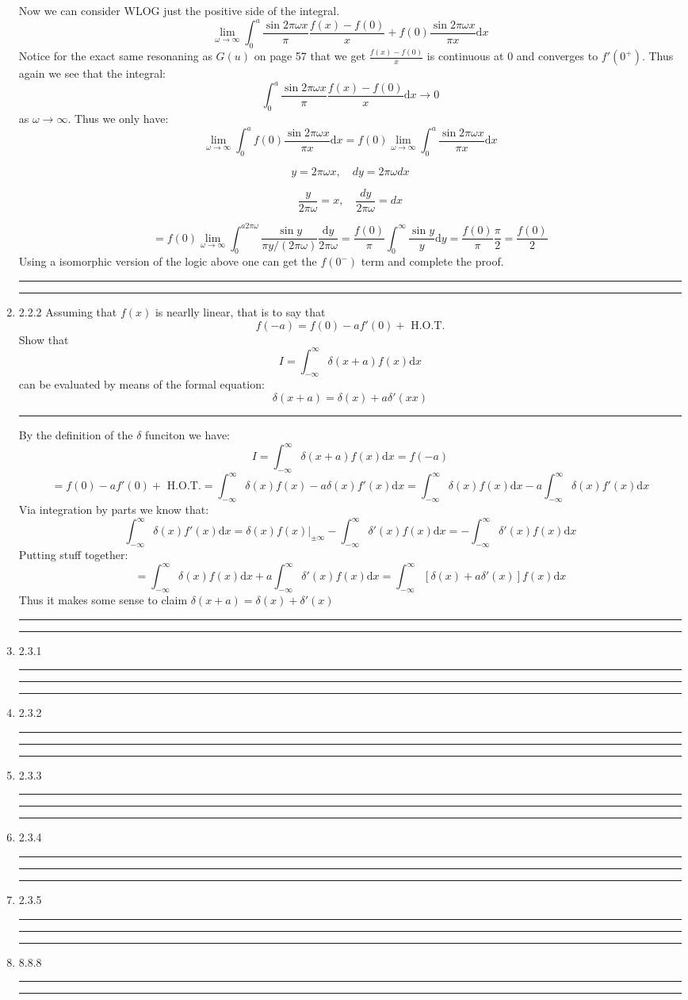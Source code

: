 \documentclass[12pt]{article}
\newcommand{\rw}{\rightarrow}
\newcommand{\di}{\mathrm{d}}
\newcommand{\intinf}{\int_{-\infty}^\infty}
\theoremstyle{definition}
\begin{document}
\begin{enumerate}
Now we can consider WLOG just the positive side of the integral.
\[
	\lim_{\omega \rw \infty} \int_{0}^a\frac { \sin 2 \pi \omega x } \pi  \frac{ f(x)  - f(0)}  { x}
+f(0)\frac { \sin 2 \pi \omega x } { \pi x}\di x
\]
Notice for the exact same resonaning as $G(u)$ on page 57 that we get $\frac{ f(x) - f(0)} {x}$ is continuous at 0 and converges to $f'(0^+)$. 
Thus again we see that the integral:
\[
	\int_{0}^a\frac { \sin 2 \pi \omega x } \pi  \frac{ f(x)  - f(0)}  { x} \di x 
	\rw 0
\]
as $\omega \rw \infty$. Thus we only have:
\[
	\lim_{\omega \rw \infty} \int_0^a f(0)\frac { \sin 2 \pi \omega x } { \pi x}\di x
	=
	f(0) \lim_{\omega \rw \infty} \int_0^a \frac { \sin 2 \pi \omega x } { \pi x}\di x
\]

	\[
	y = 2 \pi \omega x, \quad 
	dy = 2 \pi \omega dx
	\]

	\[
	\frac y {2 \pi \omega } = x, \quad 
	\frac {dy} { 2 \pi \omega } = dx
	\]

\[
	=
	f(0) \lim_{\omega \rw \infty} \int_0^{a 2 \pi \omega} \frac { \sin y } { \pi y/ (2 \pi \omega) }\frac{ \di y} {2 \pi \omega}
	=
	\frac {f(0)} \pi  \int_0^{\infty} \frac { \sin y } {  y } \di y
	=
	\frac {f(0)} \pi  \frac \pi 2
	=
	\frac {f(0)} 2
\]
Using a isomorphic version of the logic above one can get the $f(0^-)$ term and complete the proof.
\hrule


\hrule
\item 2.2.2
	Assuming that $f(x)$ is nearlly linear, that is to say that 
	\[
		f(-a) = f(0) - a f'(0) + \text{ H.O.T.}
	\]
	Show that 
	\[
	I = \intinf \delta ( x+a) f(x) \di x
	\]
	can be evaluated by means of the formal equation:
	\[
	\delta(x+a) = \delta(x) + a \delta'(xx)
	\]
\hrule

By the definition of the $\delta$ funciton we have:
\[
	I = \intinf \delta ( x+a) f(x) \di x = f(-a)
\]
\[
	=
	f(0) - a f'(0) + \text{ H.O.T.}
	= 
	\intinf  \delta (x)f(x)  - a \delta(x)f'(x) \di x 
	= 
	\intinf  \delta (x)f(x)\di x  - a \intinf \delta(x)f'(x) \di x 
\]
Via integration by parts we know that:
\[
\intinf \delta(x)f'(x) \di x 
=
\delta(x) f(x) |_{\pm \infty}
- \intinf \delta'(x)f(x) \di x 
=
- \intinf \delta'(x)f(x) \di x 
\]
Putting stuff together:
\[
	= 
	\intinf  \delta (x)f(x)\di x  + a \intinf \delta'(x)f(x) \di x 
	= 
	\intinf  \left[\delta (x)+ a \delta'(x)\right]f(x) \di x 
\]
Thus it makes some sense to claim $\delta (x +a ) = \delta(x) + \delta'(x)$
\hrule


\hrule
\item 2.3.1
\hrule
\hrule


\hrule
\item 2.3.2
\hrule
\hrule


\hrule
\item 2.3.3
\hrule
\hrule


\hrule
\item 2.3.4
\hrule
\hrule


\hrule
\item 2.3.5
\hrule
\hrule









\hrule
\item 8.8.8
\hrule
\hrule

\end{enumerate}
\end{document}

